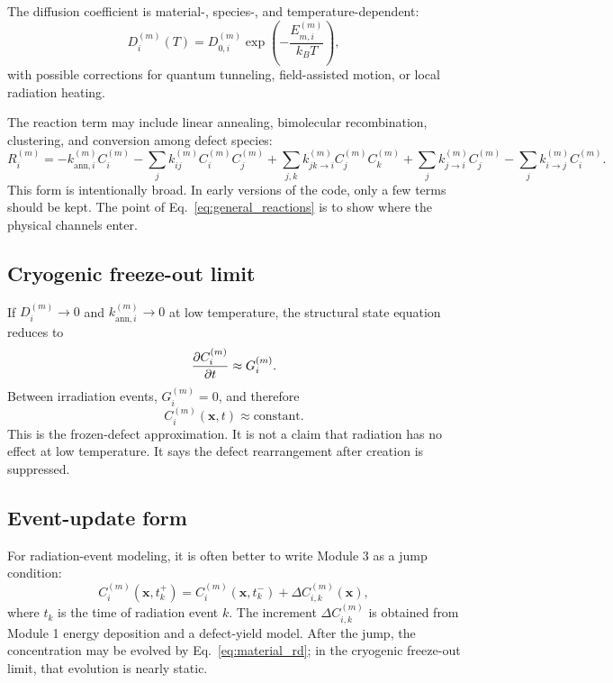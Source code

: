 \documentclass[11pt]{article}
\newcommand{\x}{\mathbf{x}}
\begin{document}
The diffusion coefficient is material-, species-, and temperature-dependent:
\begin{equation}
D_i^{(m)}(T)=D_{0,i}^{(m)}\exp\left(-\frac{E_{m,i}^{(m)}}{k_BT}\right),
\label{eq:mat_dep_diffusivity}
\end{equation}
with possible corrections for quantum tunneling, field-assisted motion, or local radiation heating.

The reaction term may include linear annealing, bimolecular recombination, clustering, and conversion among defect species:
\begin{equation}
R_i^{(m)}
= -k_{\mathrm{ann},i}^{(m)}C_i^{(m)}
-\sum_j k_{ij}^{(m)}C_i^{(m)}C_j^{(m)}
+\sum_{j,k} k_{jk\rightarrow i}^{(m)}C_j^{(m)}C_k^{(m)}
+\sum_j k_{j\rightarrow i}^{(m)}C_j^{(m)}
-\sum_j k_{i\rightarrow j}^{(m)}C_i^{(m)}.
\label{eq:general_reactions}
\end{equation}
This form is intentionally broad. In early versions of the code, only a few terms should be kept. The point of Eq.~\eqref{eq:general_reactions} is to show where the physical channels enter.

\subsection{Cryogenic freeze-out limit}

If $D_i^{(m)}\rightarrow 0$ and $k_{\mathrm{ann},i}^{(m)}\rightarrow 0$ at low temperature, the structural state equation reduces to
\begin{equation}
\pdv{C_i^{(m)}}{t}\approx G_i^{(m)}.
\label{eq:frozen_defect_eq}
\end{equation}
Between irradiation events, $G_i^{(m)}=0$, and therefore
\begin{equation}
C_i^{(m)}(\x,t)\approx \text{constant}.
\end{equation}
This is the frozen-defect approximation. It is not a claim that radiation has no effect at low temperature. It says the defect rearrangement after creation is suppressed.

\subsection{Event-update form}

For radiation-event modeling, it is often better to write Module 3 as a jump condition:
\begin{equation}
C_i^{(m)}(\x,t_k^+)=C_i^{(m)}(\x,t_k^-)+\Delta C_{i,k}^{(m)}(\x),
\label{eq:event_update}
\end{equation}
where $t_k$ is the time of radiation event $k$. The increment $\Delta C_{i,k}^{(m)}$ is obtained from Module 1 energy deposition and a defect-yield model. After the jump, the concentration may be evolved by Eq.~\eqref{eq:material_rd}; in the cryogenic freeze-out limit, that evolution is nearly static.
\end{document}
